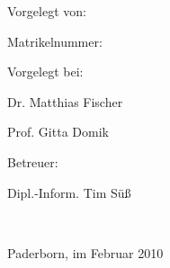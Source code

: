 \begin{titlepage}
\begin{center}
  \vspace{2.0cm}
  \begin{normalsize}Vorgelegt von: \end{normalsize} 


  \begin{Large}\dmseries\thesisauthor\end{Large} 


  \begin{normalsize}Matrikelnummer: \matrikelnr\end{normalsize} \bigskip


  \vspace{1.0cm}
  \begin{normalsize}Vorgelegt bei: \end{normalsize} 


  \begin{large}\dmseries Dr. Matthias Fischer\end{large} 


  \begin{large}\dmseries Prof. Gitta Domik\end{large}\bigskip 


  \begin{normalsize}Betreuer: \end{normalsize} 


  \begin{large}\dmseries Dipl.-Inform. Tim S\"{u}\ss\end{large} \bigskip


  \vspace{3.0cm}
  \begin{normalsize}\institut\end{normalsize}\\
  \begin{normalsize}\institutsuni\end{normalsize}\bigskip 


  \begin{normalsize}Paderborn, im Februar 2010\end{normalsize}

\end{center}
\end{titlepage}
\newpage~\newpage
%
%
